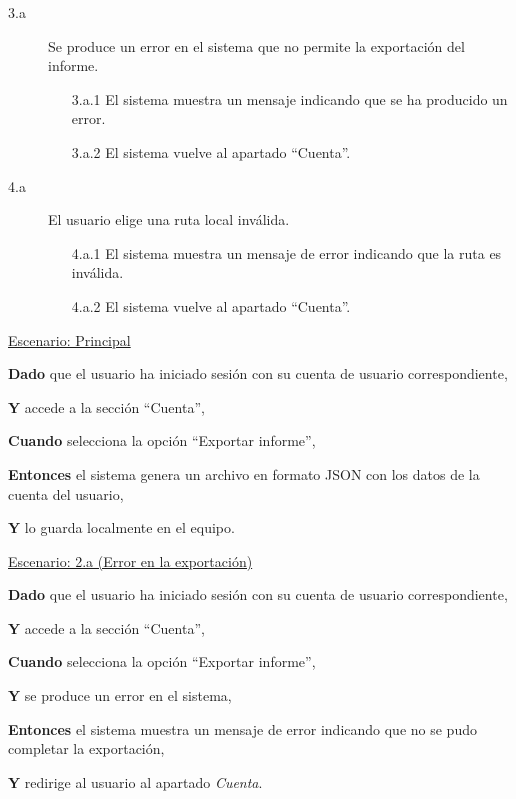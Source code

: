 \begin{description}
    \item[3.a] Se produce un error en el sistema que no permite la exportación del informe.
    \begin{enumerate}
        \item[3.a.1] El sistema muestra un mensaje indicando que se ha producido un error.
        \item[3.a.2] El sistema vuelve al apartado \enquote{Cuenta}.
    \end{enumerate}

    \item[4.a] El usuario elige una ruta local inválida.
    \begin{enumerate}
        \item[4.a.1] El sistema muestra un mensaje de error indicando que la ruta es inválida.
        \item[4.a.2] El sistema vuelve al apartado \enquote{Cuenta}.
    \end{enumerate}

\end{description}

\underline{Escenario: Principal}\par
\vspace{0.15cm}
\textbf{Dado} que el usuario ha iniciado sesión con su cuenta de usuario correspondiente,\par 
\textbf{Y} accede a la sección \enquote{Cuenta},\par 
\textbf{Cuando} selecciona la opción \enquote{Exportar informe},\par
\textbf{Entonces} el sistema genera un archivo en formato JSON con los datos de la cuenta del usuario,\par
\textbf{Y} lo guarda localmente en el equipo.\par
\vspace{0.20cm}

\underline{Escenario: 2.a (Error en la exportación)}\par
\vspace{0.15cm}
\textbf{Dado} que el usuario ha iniciado sesión con su cuenta de usuario correspondiente,\par 
\textbf{Y} accede a la sección \enquote{Cuenta},\par 
\textbf{Cuando} selecciona la opción \enquote{Exportar informe}, \par
\textbf{Y} se produce un error en el sistema,\par
\textbf{Entonces} el sistema muestra un mensaje de error indicando que no se pudo completar la exportación,\par
\textbf{Y} redirige al usuario al apartado \textit{Cuenta}.\par
\vspace{0.20cm}

